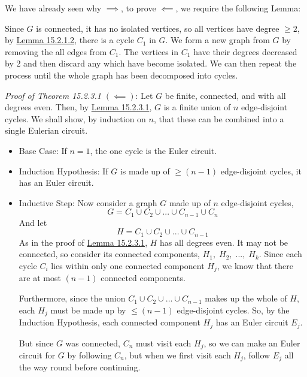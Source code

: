 {We have already seen why \(\implies\), to prove \(\impliedby\), we require the following Lemma:

{Since \(G\) is connected, it has no isolated vertices, so all vertices have degree \(\geq 2\), by \hyperref[lem:15.2.1.2]{Lemma 15.2.1.2}, there is a cycle \(C_1\) in \(G\). We form a new graph from \(G\) by removing the all edges from \(C_1\). The vertices in \(C_1\) have their degrees decreased by 2 and then discard any which have become isolated. We can then repeat the process until the whole graph has been decomposed into cycles.}

\noindent\textit{Proof of Theorem 15.2.3.1 \((\impliedby)\)}: Let \(G\) be finite, connected, and with all degrees even. Then, by \hyperref[lem:15.2.3.1]{Lemma 15.2.3.1}, \(G\) is a finite union of \(n\) edge-disjoint cycles. We shall show, by induction on \(n\), that these can be combined into a single Eulerian circuit.
\begin{itemize}
    \item Base Case: If \(n=1\), the one cycle is the Euler circuit.
    \item Induction Hypothesis: If \(G\) is made up of \(\geq (n-1)\) edge-disjoint cycles, it has an Euler circuit.  
    \item Inductive Step: Now consider a graph \(G\) made up of \(n\) edge-disjoint cycles,
    \begin{equation}
        G = C_1 \cup C_2 \cup ... \cup C_{n-1} \cup C_n
    \end{equation}
    And let 
    \begin{equation}
        H = C_1 \cup C_2 \cup ... \cup C_{n-1}
    \end{equation}
    As in the proof of \hyperref[lem:15.2.3.1]{Lemma 15.2.3.1}, \(H\) has all degrees even. It may not be connected, so consider its connected components, \(H_1,\;H_2,\;...,\;H_k\). Since each cycle \(C_i\) lies within only one connected component \(H_j\), we know that there are at most \((n-1)\) connected components. 
    
    Furthermore, since the union \(C_1 \cup C_2 \cup ... \cup C_{n-1}\) makes up the whole of \(H\), each \(H_j\) must be made up by \(\leq (n-1)\) edge-disjoint cycles. So, by the Induction Hypothesis, each connected component \(H_j\) has an Euler circuit \(E_j\).

    But since \(G\) was connected, \(C_n\) must visit each \(H_j\), so we can make an Euler circuit for \(G\) by following \(C_n\), but when we first visit each \(H_j\), follow \(E_j\) all the way round before continuing.
\end{itemize}}

